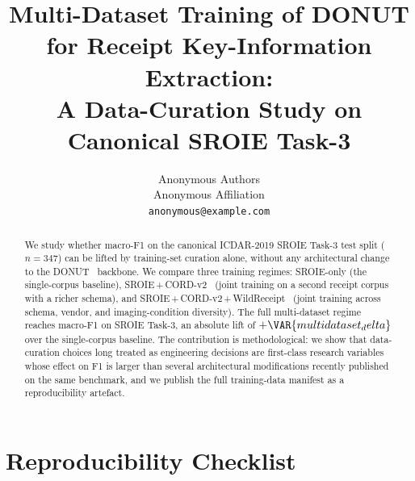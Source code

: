 \documentclass[conference]{IEEEtran}
\title{Multi-Dataset Training of DONUT for Receipt Key-Information Extraction:\\
       A Data-Curation Study on Canonical SROIE Task-3}
\author{Anonymous Authors\\Anonymous Affiliation\\
        \texttt{anonymous@example.com}}
\begin{document}
\maketitle

\begin{abstract}
We study whether macro-F1 on the canonical ICDAR-2019 SROIE Task-3
test split ($n=347$) can be lifted by training-set curation alone,
without any architectural change to the DONUT~\cite{kim2022donut}
backbone.  We compare three training regimes: SROIE-only (the
single-corpus baseline), SROIE\,+\,CORD-v2~\cite{park2019cord} (joint
training on a second receipt corpus with a richer schema), and
SROIE\,+\,CORD-v2\,+\,WildReceipt~\cite{sun2021wildreceipt} (joint
training across schema, vendor, and imaging-condition diversity).
The full multi-dataset regime reaches  macro-F1 on
SROIE Task-3, an absolute lift of $+\VAR{multidataset_delta}$ over
the single-corpus baseline.  The contribution is methodological:
we show that data-curation choices long treated as engineering
decisions are first-class research variables whose effect on F1 is
larger than several architectural modifications recently published
on the same benchmark, and we publish the full training-data
manifest as a reproducibility artefact.
\end{abstract}




























\section*{Reproducibility Checklist}
\label{sec:repro_checklist}

\end{document}
